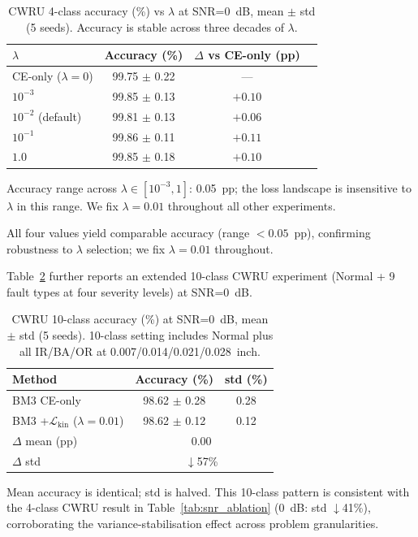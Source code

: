 \begin{table}[htbp]
\centering
\caption{CWRU 4-class accuracy (\%) vs $\lambda$ at SNR=0~dB,
         mean $\pm$ std (5 seeds). Accuracy is stable across three
         decades of $\lambda$.}
\label{tab:lambda}
\begin{tabular}{lccc}
\toprule
$\lambda$ & Accuracy (\%) & $\Delta$ vs CE-only (pp) \\
\midrule
CE-only ($\lambda=0$)  & 99.75 $\pm$ 0.22 & --- \\
$10^{-3}$              & 99.85 $\pm$ 0.13 & $+0.10$ \\
$10^{-2}$ (default)    & 99.81 $\pm$ 0.13 & $+0.06$ \\
$10^{-1}$              & 99.86 $\pm$ 0.11 & $+0.11$ \\
$1.0$                  & 99.85 $\pm$ 0.18 & $+0.10$ \\
\bottomrule
\end{tabular}
\begin{tablenotes}
\item Accuracy range across $\lambda \in [10^{-3}, 1]$: 0.05~pp;
      the loss landscape is insensitive to $\lambda$ in this range.
      We fix $\lambda = 0.01$ throughout all other experiments.
\end{tablenotes}
\end{table}

All four values yield comparable accuracy (range $< 0.05$~pp),
confirming robustness to $\lambda$ selection; we fix $\lambda = 0.01$
throughout.

Table~\ref{tab:10class} further reports an extended 10-class CWRU
experiment (Normal + 9 fault types at four severity levels) at SNR=0~dB.

\begin{table}[htbp]
\centering
\caption{CWRU 10-class accuracy (\%) at SNR=0~dB, mean $\pm$ std (5 seeds).
         10-class setting includes Normal plus all IR/BA/OR at 0.007/0.014/0.021/0.028~inch.}
\label{tab:10class}
\begin{tabular}{lcc}
\toprule
Method & Accuracy (\%) & std (\%) \\
\midrule
BM3 CE-only                              & 98.62 $\pm$ 0.28 & 0.28 \\
BM3 +$\mathcal{L}_{\text{kin}}$ ($\lambda=0.01$) & 98.62 $\pm$ 0.12 & 0.12 \\
\midrule
$\Delta$ mean (pp) & \multicolumn{2}{c}{0.00} \\
$\Delta$ std       & \multicolumn{2}{c}{$\downarrow$57\%} \\
\bottomrule
\end{tabular}
\begin{tablenotes}
\item Mean accuracy is identical; std is halved. This 10-class pattern is
      consistent with the 4-class CWRU result in Table~\ref{tab:snr_ablation}
      (0~dB: std $\downarrow$41\%), corroborating the variance-stabilisation
      effect across problem granularities.
\end{tablenotes}
\end{table}

